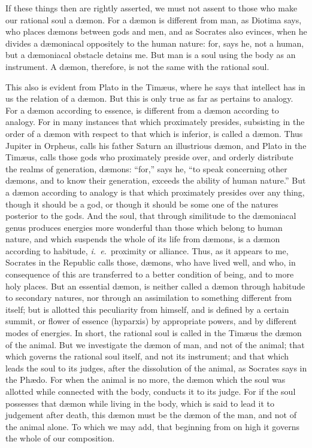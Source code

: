\documentclass[12pt]{article}
\begin{document}
If these things then are rightly asserted, we must not assent to those who make
our rational soul a d{\ae}mon. For a d{\ae}mon is different from man, as
Diotima says, who places d{\ae}mons between gods and men, and as Socrates also
evinces, when he divides a d{\ae}moniacal oppositely to the human nature: for,
says he, not a human, but a d{\ae}moniacal obstacle detains me. But man is a
soul using the body as an instrument. A d{\ae}mon, therefore, is not the same
with the rational soul.

This also is evident from Plato in the Tim{\ae}us, where he says that intellect
has in us the relation of a d{\ae}mon. But this is only true as far as
pertains to analogy. For a d{\ae}mon according to essence, is different from a
d{\ae}mon according to analogy. For in many instances that which proximately
presides, subsisting in the order of a d{\ae}mon with respect to that which is
inferior, is called a d{\ae}mon. Thus Jupiter in Orpheus, calls his father
Saturn an illustrious d{\ae}mon, and Plato in the Tim{\ae}us, calls those gods
who proximately preside over, and orderly distribute the realms of generation,
d{\ae}mons: ``for,'' says he, ``to speak concerning other d{\ae}mons, and to
know their generation, exceeds the ability of human nature.'' But a d{\ae}mon
according to analogy is that which proximately presides over any thing, though
it should be a god, or though it should be some one of the natures posterior to
the gods. And the soul, that through similitude to the d{\ae}moniacal genus
produces energies more wonderful than those which belong to human nature, and
which suspends the whole of its life from d{\ae}mons, is a d{\ae}mon according
to habitude, \textit{i.~e.}~proximity or alliance. Thus, as it appears to me,
Socrates in the Republic calls those, d{\ae}mons, who have lived well, and who,
in consequence of this are transferred to a better condition of being, and to
more holy places. But an essential d{\ae}mon, is neither called a d{\ae}mon
through habitude to secondary natures, nor through an assimilation to something
different from itself; but is allotted this peculiarity from himself, and is
defined by a certain summit, or flower of essence (hyparxis) by appropriate
powers, and by different modes of energies. In short, the rational soul is
called in the Tim{\ae}us the d{\ae}mon of the animal. But we investigate the
d{\ae}mon of man, and not of the animal; that which governs the rational soul
itself, and not its instrument; and that which leads the soul to its judges,
after the dissolution of the animal, as Socrates says in the Ph{\ae}do. For
when the animal is no more, the d{\ae}mon which the soul was allotted while
connected with the body, conducts it to its judge. For if the soul possesses
that d{\ae}mon while living in the body, which is said to lead it to judgement
after death, this d{\ae}mon must be the d{\ae}mon of the man, and not of the
animal alone. To which we may add, that beginning from on high it governs the
whole of our composition.
\end{document}
